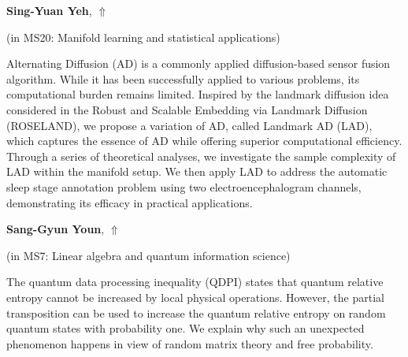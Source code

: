 \documentclass[ILAS2025-program.tex]{subfiles}
\begin{document}
\hypertarget{down0150}{}\begin{ilasabstract}
    
\textbf{Sing-Yuan Yeh},  \hfill \hyperlink{up0150}{$\Uparrow$}
    
    
(in {\color{mstitle}MS20: Manifold learning and statistical applications})
        
\mtskip
    Alternating Diffusion (AD) is a commonly applied diffusion-based sensor fusion algorithm. While it has been successfully applied to various problems, its computational burden remains limited. Inspired by the landmark diffusion idea considered in the Robust and Scalable Embedding via Landmark Diffusion (ROSELAND), we propose a variation of AD, called Landmark AD (LAD), which captures the essence of AD while offering superior computational efficiency. Through a series of theoretical analyses, we investigate the sample complexity of LAD within the manifold setup. We then apply LAD to address the automatic sleep stage annotation problem using two electroencephalogram channels, demonstrating its efficacy in practical applications.

\end{ilasabstract}
    

\hypertarget{down0362}{}\begin{ilasabstract}
    
\textbf{Sang-Gyun Youn},  \hfill \hyperlink{up0362}{$\Uparrow$}
    
    
(in {\color{mstitle}MS7: Linear algebra and quantum information science})
        
\mtskip
    The quantum data processing inequality (QDPI) states that quantum relative entropy cannot be increased by local physical operations. However, the partial transposition can be used to increase the quantum relative entropy on random quantum states with probability one. We explain why such an unexpected phenomenon happens in view of random matrix theory and free probability.
\end{ilasabstract}
    
\end{document}
